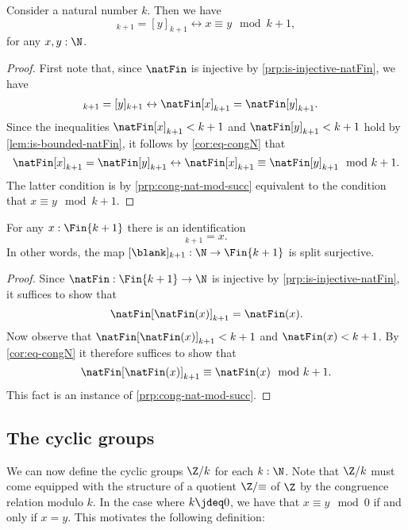\begin{thm}\label{thm:effective-mod-k}
  Consider a natural number $k$. Then we have
  \begin{equation*}
    [x]_{k+1}=[y]_{k+1} \leftrightarrow x\equiv y\mod k+1,
  \end{equation*}
  for any $x,y:\N$.
\end{thm}

\begin{proof}
  First note that, since $\natFin$ is injective by \cref{prp:is-injective-natFin}, we have
  \begin{align*}
    [x]_{k+1}=[y]_{k+1} & \leftrightarrow \natFin[x]_{k+1}=\natFin[y]_{k+1}.
  \end{align*}
  Since the inequalities $\natFin[x]_{k+1}<k+1$ and $\natFin[y]_{k+1}<k+1$ hold by \cref{lem:is-bounded-natFin}, it follows by \cref{cor:eq-congN} that
  \begin{equation*}
    \natFin[x]_{k+1}=\natFin[y]_{k+1}\leftrightarrow \natFin[x]_{k+1}\equiv\natFin[y]_{k+1}\mod k+1.   
  \end{equation*}
  The latter condition is by \cref{prp:cong-nat-mod-succ} equivalent to the condition that $x\equiv y\mod k+1$.
\end{proof}

\begin{thm}\label{thm:issec-nat-Fin}
  For any $x:\Fin{k+1}$ there is an identification
  \begin{equation*}
    [\natFin(x)]_{k+1}=x.
  \end{equation*}
  In other words, the map $[\blank]_{k+1}:\N\to \Fin{k+1}$ is split surjective.
\end{thm}

\begin{proof}
  Since $\natFin:\Fin{k+1}\to\N$ is injective by \cref{prp:is-injective-natFin}, it suffices to show that
  \begin{equation*}
    \natFin[\natFin(x)]_{k+1}=\natFin(x).
  \end{equation*}
  Now observe that $\natFin[\natFin(x)]_{k+1}<k+1$ and $\natFin(x)<k+1$. By \cref{cor:eq-congN} it therefore suffices to show that
  \begin{equation*}
    \natFin[\natFin(x)]_{k+1}\equiv\natFin(x)\mod{k+1}.
  \end{equation*}
  This fact is an instance of \cref{prp:cong-nat-mod-succ}.
\end{proof}

\subsection{The cyclic groups}
We can now define the cyclic groups $\Z/k$ for each $k:\N$. Note that $\Z/k$ must come equipped with the structure of a quotient $\Z/{\equiv}$ of $\Z$ by the congruence relation modulo $k$. In the case where $k\jdeq 0$, we have that $x\equiv y\mod{0}$ if and only if $x=y$. This motivates the following definition:

